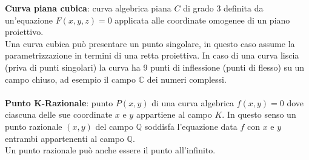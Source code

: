 \documentclass[a4paper,12pt]{tesiinfo}
\begin{document}
%
%
%
\textbf{Curva piana cubica}: curva algebrica piana $C$ di grado 3 definita da un'equazione $F(x, y, z) = 0$ applicata alle coordinate omogenee di un piano proiettivo. 
\\
Una curva cubica pu\`o presentare un punto singolare, in questo caso assume la parametrizzazione in termini di una retta proiettiva. In caso di una curva liscia (priva di punti singolari) la curva ha 9 punti di inflessione (punti di flesso) su un campo chiuso, ad esempio il campo $\mathbb{C}$ dei numeri complessi. 
\\\\
%
%
%
\textbf{Punto $\mathbold{K}$-Razionale}: punto $P(x, y)$ di una curva algebrica $f(x, y)=0$ dove ciascuna delle sue coordinate $x$ e $y$ appartiene al campo $K$. In questo senso un punto razionale $(x, y)$ del campo $\mathbb{Q}$ soddisfa l'equazione data $f$ con $x$ e $y$ entrambi appartenenti al campo $\mathbb{Q}$. 
\\
Un punto razionale pu\`o anche essere il punto all'infinito.
%
%
%
%
%
%
%
%
%
%
\end{document}
